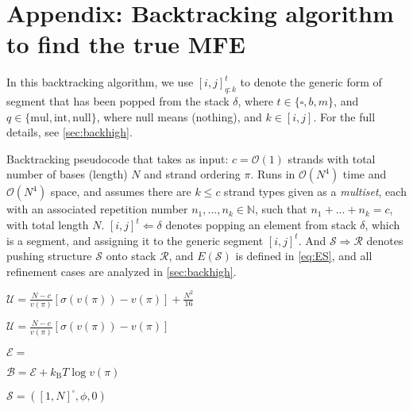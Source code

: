 
\section{Appendix: Backtracking algorithm to find the true MFE }\label{app:backalgo}

In this backtracking algorithm, we use  $[i,j]_{q:k}^t $ to denote the generic form of segment that has been popped from the stack $\delta$, where $t \in \{\square,b,m\}$, and $q \in \{\text{mul}, \text{int},  \text{null}\}$, where null means (nothing), and $k \in [i,j]$. For the full details, see \cref{sec:backhigh}. 


\begin{algorithm}[t] 
	\caption{\small Backtracking pseudocode that takes as input: $c=\mathcal{O}(1)$ strands with total number of bases (length) $N$ and strand ordering $\pi$. 
		Runs in  $\mathcal{O}(N^4)$ time and $\mathcal{O}(N^4)$ space, and assumes there are $k \leq c$ strand types given as a \emph{multiset}, 
		each with an associated repetition number $n_1, ..., n_k \in \mathbb{N}$, such that $n_1+ ...+n_k = c$, with total length $N$. 
		$[i,j]^t \Leftarrow \delta$ denotes  popping an element from stack $\delta$, 
		which is a segment, and assigning it to the generic segment $[i,j]^t$.  
		And $\mathcal{S} \Rightarrow \mathcal{R}$ denotes pushing structure $\mathcal{S}$ onto stack $\mathcal{R}$, and  $E(\mathcal{S})$ is defined in \cref{eq:ES}, and all refinement cases are analyzed in \cref{sec:backhigh}.
	} \label{algo:2}
	\begin{algorithmic}[1]
		\footnotesize	
		\State $\mathcal{U} =  \frac{N-c}{v(\pi)} \left[ \sigma(v(\pi))-v(\pi) \right] + \frac{N^2}{16}$  
		
		\Else
		
		\State $\mathcal{U} =  \frac{N-c}{v(\pi)} \left[ \sigma(v(\pi))-v(\pi) \right]$
		
		\EndIf
		
		\State $\mathcal{E} =$ \snMFE {}
		
		\State $\mathcal{B} = \mathcal{E}+ k_\mathrm{B} T \log v(\pi)$ 
		
		
		
		\State $\mathcal{S} = ([1,N]^\square, \phi,0)$ 
		

\end{algorithmic}
\end{algorithm}
